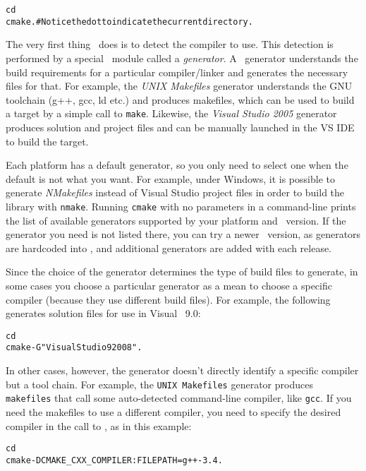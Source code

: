 {\ccTexHtml{\scriptsize}{}
\begin{alltt}
  cd  \cgalrel
  cmake . # Notice the dot to indicate the current directory.
\end{alltt}
}

The very first thing \cmake\ does is to detect the compiler to use.  This
detection is performed by a special \cmake\ module called a {\em
  generator}. A \cmake\ generator understands the build requirements for a
particular compiler/linker and generates the necessary files for that. For
example, the {\em UNIX Makefiles} generator understands the GNU toolchain
(g++, gcc, ld etc.) and produces makefiles, which can be used to build a
target by a simple call to \texttt{make}.  Likewise, the {\em Visual Studio
  2005} generator produces solution and project files and can be manually
launched in the VS IDE to build the target.

Each platform has a default generator, so you only need to select one when
the default is not what you want.  For example, under Windows, it is
possible to generate {\em NMakefiles} instead of Visual Studio project
files in order to build the library with \texttt{nmake}.  Running
\texttt{cmake} with no parameters in a command-line prints the list of
available generators supported by your platform and \cmake\ version. If the
generator you need is not listed there, you can try a newer \cmake\
version, as generators are hardcoded into \cmake, and additional
generators are added with each release.

Since the choice of the generator determines the type of build files to generate, in some cases
you choose a particular generator as a mean to choose a specific compiler (because they use different 
build files). For example, the following generates solution files for use in Visual \CC\ 9.0:

{\ccTexHtml{\scriptsize}{}
\begin{alltt}
  cd \cgalrel
  cmake -G"Visual Studio 9 2008" . 
\end{alltt}
}

In other cases, however, the generator doesn't directly identify a specific compiler but a tool chain.
For example, the \texttt{UNIX Makefiles} generator produces \texttt{makefiles} that call some auto-detected
command-line compiler, like \texttt{gcc}. If you need the makefiles to use a different compiler, you need to
specify the desired compiler in the call to \cmake{}, as in this example:

{\ccTexHtml{\scriptsize}{}
\begin{alltt}
  cd \cgalrel
  cmake -DCMAKE_CXX_COMPILER:FILEPATH=g++-3.4 . 
\end{alltt}
}

